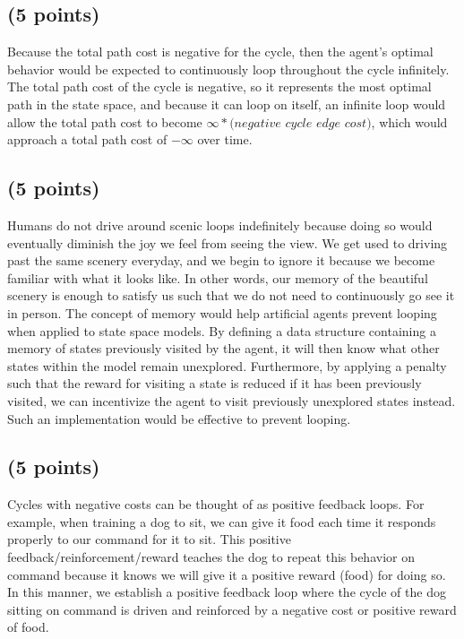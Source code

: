 \documentclass[12pt]{article}
\begin{document}
\subsection{(5 points)}
Because the total path cost is negative for the cycle, then the agent's optimal behavior would be expected to continuously loop throughout the cycle infinitely. The total path cost of the cycle is negative, so it represents the most optimal path in the state space, and because it can loop on itself, an infinite loop would allow the total path cost to become $\infty*(negative$ $cycle$ $edge$ $cost)$, which would approach a total path cost of $-\infty$ over time. 

\subsection{(5 points)}
Humans do not drive around scenic loops indefinitely because doing so would eventually diminish the joy we feel from seeing the view. We get used to driving past the same scenery everyday, and we begin to ignore it because we become familiar with what it looks like. In other words, our memory of the beautiful scenery is enough to satisfy us such that we do not need to continuously go see it in person. The concept of memory would help artificial agents prevent looping when applied to state space models. By defining a data structure containing a memory of states previously visited by the agent, it will then know what other states within the model remain unexplored. Furthermore, by applying a penalty such that the reward for visiting a state is reduced if it has been previously visited, we can incentivize the agent to visit previously unexplored states instead. Such an implementation would be effective to prevent looping. 

\subsection{(5 points)}
Cycles with negative costs can be thought of as positive feedback loops. For example, when training a dog to sit, we can give it food each time it responds properly to our command for it to sit. This positive feedback/reinforcement/reward teaches the dog to repeat this behavior on command because it knows we will give it a positive reward (food) for doing so. In this manner, we establish a positive feedback loop where the cycle of the dog sitting on command is driven and reinforced by a negative cost or positive reward of food. 
\end{document}
